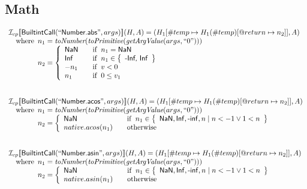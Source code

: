 \subsection{Math}
\[
\begin{array}{l}

\I _{cp}\lbr \SF{BuiltintCall}(``\SF{Number.abs}",args)\rbr(H,A)
  = (H_1[\#temp \mapsto H_1(\#temp)[@return \mapsto n_2]], A)\\
\quad\wherec{
  n_1 = \hf{toNumber}(\hf{toPrimitive}(\hf{getArgValue}(args, ``0")))\\
  n_2 = \left\{
    \begin{array}{l@{\quad\quad}l}
      \SF{NaN} & \ifc{n_1=\SF{NaN}} \\
      \SF{Inf} & \ifc{n_1\in\set{\SF{-Inf, Inf}}} \\
      -n_1 & \ifc{v<0} \\
      n_1 & \ifc{0\leq v_1} \\
    \end{array}
  \right.
  }\\
\\\\


\I _{cp}\lbr \SF{BuiltintCall}(``\SF{Number.acos}",args)\rbr(H,A)
  = (H_1[\#temp \mapsto H_1(\#temp)[@return \mapsto n_2]], A)\\
\quad\wherec{
  n_1 = \hf{toNumber}(\hf{toPrimitive}(\hf{getArgValue}(args, ``0")))\\
  n_2 = \left\{
    \begin{array}{l@{\quad\quad}l}
      \SF{NaN} & \ifc{n_1 \in \set{\SF{NaN}, \SF{Inf}, \SF{-inf}, n \mid n<-1 \lor 1<n}} \\
      native.acos(n_1) & \owc
    \end{array}
  \right.
  }\\
\\\\


\I _{cp}\lbr \SF{BuiltintCall}(``\SF{Number.asin}",args)\rbr(H,A)
  = (H_1[\#temp \mapsto H_1(\#temp)[@return \mapsto n_2]], A)\\
\quad\wherec{
  n_1 = \hf{toNumber}(\hf{toPrimitive}(\hf{getArgValue}(args, ``0")))\\
  n_2 = \left\{
    \begin{array}{l@{\quad\quad}l}
      \SF{NaN} & \ifc{n_1 \in \set{\SF{NaN}, \SF{Inf}, \SF{-inf}, n \mid n<-1 \lor 1<n}} \\
      native.asin(n_1) & \owc
    \end{array}
  \right.
  }\\
\\\\



\end{array}\]
